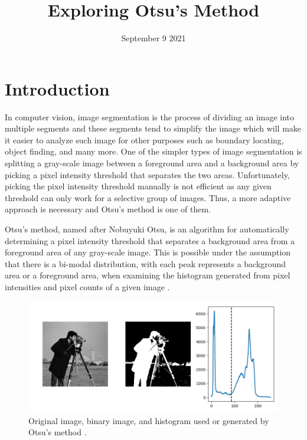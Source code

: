 \documentclass[conference]{IEEEtran}
\title{Exploring Otsu's Method}
\author{
    \IEEEauthorblockN{Sotheanith Sok}
    \IEEEauthorblockA{
        Department of Engineering\\ 
        California State University of Long Beach\\
        Sotheanith.Sok@student.csulb.edu
    }
}
\date{September 9 2021}
\begin{document}
\maketitle

\section{Introduction}
In computer vision, image segmentation is the process of dividing an image into multiple segments and these segments tend to simplify the image which will make it easier to analyze such image for other purposes such as boundary locating, object finding, and many more. One of the simpler types of image segmentation is splitting a gray-scale image between a foreground area and a background area by picking a pixel intensity threshold that separates the two areas. Unfortunately, picking the pixel intensity threshold manually is not efficient as any given threshold can only work for a selective group of images. Thus, a more adaptive approach is necessary and Otsu's method is one of them.

Otsu's method, named after Nobuyuki Otsu, is an algorithm for automatically determining a pixel intensity threshold that separates a background area from a foreground area of any gray-scale image. This is possible under the assumption that there is a bi-modal distribution, with each peak represents a background area or a foreground area, when examining the histogram generated from pixel intensities and pixel counts of a given image \cite{wikipedia-contributors:2020}.

\begin{figure}[!htb]
    \centering
    \includegraphics[width=\linewidth]{otsu_example.png}
    \caption{Original image, binary image, and histogram used or generated by Otsu's method \cite{scipy-lectures:2020}.}
\end{figure}
\end{document}
